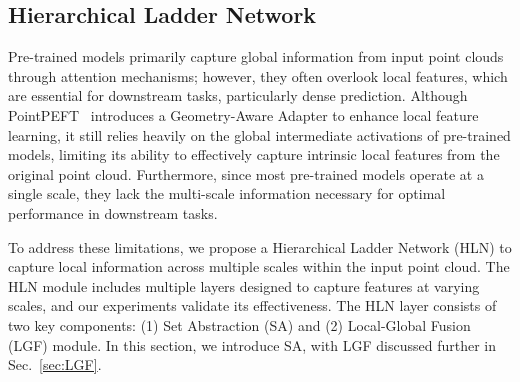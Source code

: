 

\subsection{Hierarchical Ladder Network}
\label{sec:HLN}
Pre-trained models primarily capture global information from input point clouds through attention mechanisms; however, they often overlook local features, which are essential for downstream tasks, particularly dense prediction. Although PointPEFT~\cite{tang2024point} introduces a Geometry-Aware Adapter to enhance local feature learning, it still relies heavily on the global intermediate activations of pre-trained models, limiting its ability to effectively capture intrinsic local features from the original point cloud. Furthermore, since most pre-trained models operate at a single scale, they lack the multi-scale information necessary for optimal performance in downstream tasks.

To address these limitations, we propose a Hierarchical Ladder Network (HLN) to capture local information across multiple scales within the input point cloud. The HLN module includes multiple layers designed to capture features at varying scales, and our experiments validate its effectiveness. The HLN layer consists of two key components: (1) Set Abstraction (SA) and (2) Local-Global Fusion (LGF) module. 
In this section, we introduce SA, with LGF discussed further in Sec.~\ref{sec:LGF}.

